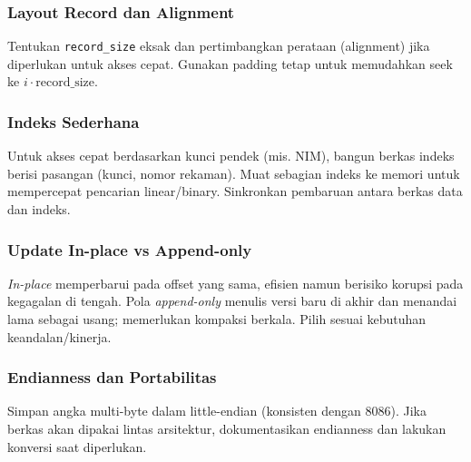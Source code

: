 \documentclass[../main.tex]{subfiles}
\begin{document}
            \subsubsection{Layout Record dan Alignment}
                Tentukan \texttt{record\_size} eksak dan pertimbangkan perataan (alignment) jika diperlukan untuk akses cepat. Gunakan padding tetap untuk memudahkan seek ke \(i\cdot \text{record\_size}\). 
            \subsubsection{Indeks Sederhana}
                Untuk akses cepat berdasarkan kunci pendek (mis. NIM), bangun berkas indeks berisi pasangan (kunci, nomor rekaman). Muat sebagian indeks ke memori untuk mempercepat pencarian linear/binary. Sinkronkan pembaruan antara berkas data dan indeks. 
            \subsubsection{Update In-place vs Append-only}
                \textit{In-place} memperbarui pada offset yang sama, efisien namun berisiko korupsi pada kegagalan di tengah. Pola \textit{append-only} menulis versi baru di akhir dan menandai lama sebagai usang; memerlukan kompaksi berkala. Pilih sesuai kebutuhan keandalan/kinerja. 
            \subsubsection{Endianness dan Portabilitas}
                Simpan angka multi-byte dalam little-endian (konsisten dengan 8086). Jika berkas akan dipakai lintas arsitektur, dokumentasikan endianness dan lakukan konversi saat diperlukan. 
\end{document}
